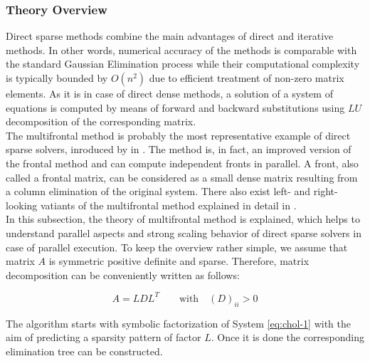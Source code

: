 \subsubsection{Theory Overview}
\label{subseq:direct-sparse methods}

Direct sparse methods combine the main advantages of direct and iterative methods. In other words, numerical accuracy of the methods is comparable with the standard Gaussian Elimination process while their computational complexity is typically bounded by $O(n^2)$ \cite{complexity-of-spdm} due to efficient treatment of non-zero matrix elements. As it is in case of direct dense methods, a solution of a system of equations is computed by means of forward and backward substitutions using $LU$ decomposition of the corresponding matrix.\\


The multifrontal method is probably the most representative example of direct sparse solvers, inroduced by \citeauthor{mult-frontal-original:1} in  \cite{mult-frontal-original:1}. The method is, in fact, an improved version of the frontal method \cite{frontal-original} and can compute independent fronts in parallel. A front, also called a frontal matrix, can be considered as a small dense matrix resulting from a column elimination of the original system. There also exist left- and right-looking vatiants of the multifrontal method explained in detail in \cite{elimination-tree}.\\


In this subsection, the theory of multifrontal method is explained, which helps to understand parallel aspects and strong scaling behavior of   direct sparse solvers in case of parallel execution. To keep the overview rather simple, we assume that matrix $A$ is symmetric positive definite and sparse. Therefore, matrix decomposition can be conveniently written as follows:


\begin{equation} \label{eq:chol-1}
	A = LDL^T \qquad \text{with}\quad (D)_{ii} > 0
\end{equation}

The algorithm starts with symbolic factorization of System \ref{eq:chol-1} with the aim of predicting a sparsity pattern of factor $L$. Once it is done the corresponding elimination tree can be constructed.\\

